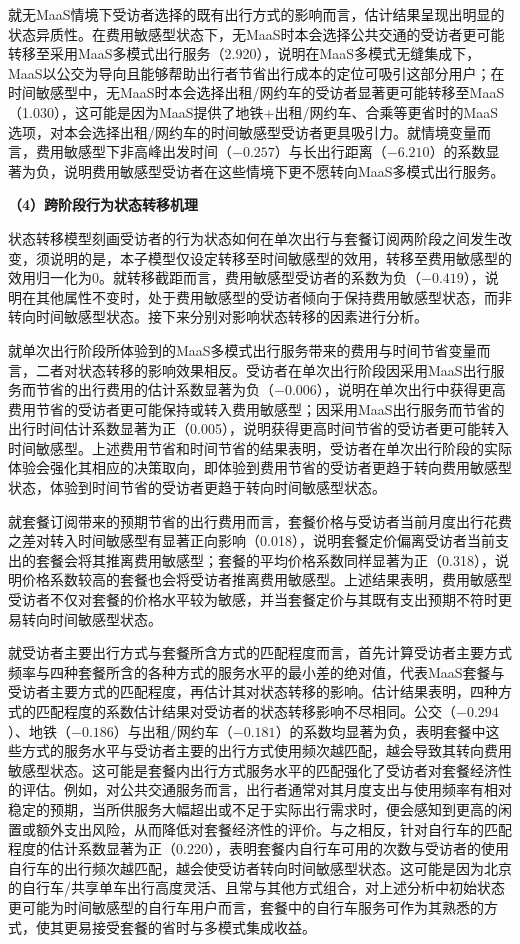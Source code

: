 就无MaaS情境下受访者选择的既有出行方式的影响而言，估计结果呈现出明显的状态异质性。在费用敏感型状态下，无MaaS时本会选择公共交通的受访者更可能转移至采用MaaS多模式出行服务（2.920），说明在MaaS多模式无缝集成下，MaaS以公交为导向且能够帮助出行者节省出行成本的定位可吸引这部分用户；在时间敏感型中，无MaaS时本会选择出租/网约车的受访者显著更可能转移至MaaS（1.030），这可能是因为MaaS提供了地铁+出租/网约车、合乘等更省时的MaaS选项，对本会选择出租/网约车的时间敏感型受访者更具吸引力。就情境变量而言，费用敏感型下非高峰出发时间（$-0.257$）与长出行距离（$-6.210$）的系数显著为负，说明费用敏感型受访者在这些情境下更不愿转向MaaS多模式出行服务。

\textbf{（4）跨阶段行为状态转移机理}

状态转移模型刻画受访者的行为状态如何在单次出行与套餐订阅两阶段之间发生改变，须说明的是，本子模型仅设定转移至时间敏感型的效用，转移至费用敏感型的效用归一化为0。就转移截距而言，费用敏感型受访者的系数为负（$-0.419$），说明在其他属性不变时，处于费用敏感型的受访者倾向于保持费用敏感型状态，而非转向时间敏感型状态。接下来分别对影响状态转移的因素进行分析。

就单次出行阶段所体验到的MaaS多模式出行服务带来的费用与时间节省变量而言，二者对状态转移的影响效果相反。受访者在单次出行阶段因采用MaaS出行服务而节省的出行费用的估计系数显著为负（$-0.006$），说明在单次出行中获得更高费用节省的受访者更可能保持或转入费用敏感型；因采用MaaS出行服务而节省的出行时间估计系数显著为正（0.005），说明获得更高时间节省的受访者更可能转入时间敏感型。上述费用节省和时间节省的结果表明，受访者在单次出行阶段的实际体验会强化其相应的决策取向，即体验到费用节省的受访者更趋于转向费用敏感型状态，体验到时间节省的受访者更趋于转向时间敏感型状态。

就套餐订阅带来的预期节省的出行费用而言，套餐价格与受访者当前月度出行花费之差对转入时间敏感型有显著正向影响（0.018），说明套餐定价偏离受访者当前支出的套餐会将其推离费用敏感型；套餐的平均价格系数同样显著为正（0.318），说明价格系数较高的套餐也会将受访者推离费用敏感型。上述结果表明，费用敏感型受访者不仅对套餐的价格水平较为敏感，并当套餐定价与其既有支出预期不符时更易转向时间敏感型状态。

就受访者主要出行方式与套餐所含方式的匹配程度而言，首先计算受访者主要方式频率与四种套餐所含的各种方式的服务水平的最小差的绝对值，代表MaaS套餐与受访者主要方式的匹配程度，再估计其对状态转移的影响。估计结果表明，四种方式的匹配程度的系数估计结果对受访者的状态转移影响不尽相同。公交（$-0.294$）、地铁（$-0.186$）与出租/网约车（$-0.181$）的系数均显著为负，表明套餐中这些方式的服务水平与受访者主要的出行方式使用频次越匹配，越会导致其转向费用敏感型状态。这可能是套餐内出行方式服务水平的匹配强化了受访者对套餐经济性的评估。例如，对公共交通服务而言，出行者通常对其月度支出与使用频率有相对稳定的预期，当所供服务大幅超出或不足于实际出行需求时，便会感知到更高的闲置或额外支出风险，从而降低对套餐经济性的评价。与之相反，针对自行车的匹配程度的估计系数显著为正（0.220），表明套餐内自行车可用的次数与受访者的使用自行车的出行频次越匹配，越会使受访者转向时间敏感型状态。这可能是因为北京的自行车/共享单车出行高度灵活、且常与其他方式组合，对上述分析中初始状态更可能为时间敏感型的自行车用户而言，套餐中的自行车服务可作为其熟悉的方式，使其更易接受套餐的省时与多模式集成收益。

